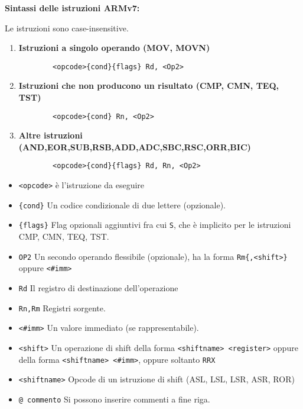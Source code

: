\begin{defn}
	\textbf{Sintassi delle istruzioni ARMv7:}
	
	\begin{note}
		Le istruzioni sono case-insensitive.
	\end{note}	
	
	\begin{enumerate}
		\item \textbf{Istruzioni a singolo operando (MOV, MOVN)}
		\begin{Verbatim}
		<opcode>{cond}{flags} Rd, <Op2>
		\end{Verbatim}
		
		\item \textbf{Istruzioni che non producono un risultato (CMP, CMN, TEQ, TST)}
		\begin{Verbatim}
		<opcode>{cond} Rn, <Op2>
		\end{Verbatim}
		
		\item \textbf{Altre istruzioni (AND,EOR,SUB,RSB,ADD,ADC,SBC,RSC,ORR,BIC)}
		\begin{Verbatim}
		<opcode>{cond}{flags} Rd, Rn, <Op2>
		\end{Verbatim}
	\end{enumerate}
	
	
	\begin{itemize}
		\item \verb|<opcode>| è l'istruzione da eseguire
		\item \verb|{cond}| Un codice condizionale di due lettere (opzionale).
		\item \verb|{flags}| Flag opzionali aggiuntivi fra cui \verb|S|, che è implicito per le istruzioni CMP, CMN, TEQ, TST.
		\item \verb|OP2| Un secondo operando flessibile (opzionale), ha la forma \verb|Rm{,<shift>}| oppure \verb|<#imm>|
		\item \verb|Rd| Il registro di destinazione dell'operazione
		\item \verb|Rn,Rm| Registri sorgente.
		\item \verb|<#imm>| Un valore immediato (se rappresentabile).
		\item \verb|<shift>| Un operazione di shift della forma \verb|<shiftname> <register>| oppure della forma \verb|<shiftname> <#imm>|, oppure soltanto \verb|RRX|
		\item \verb|<shiftname>| Opcode di un istruzione di shift (ASL, LSL, LSR, ASR, ROR)
		\item \verb|@ commento| Si possono inserire commenti a fine riga.
	\end{itemize}
\end{defn}

